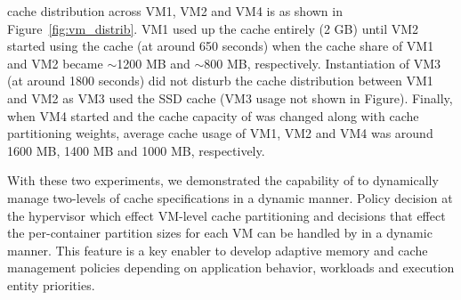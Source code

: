 \dd{} cache distribution across VM1, VM2 and VM4 is as shown in
Figure~\ref{fig:vm_distrib}.
%
VM1 used up the \dd{} cache entirely (2 GB) until VM2 started
using the cache (at around 650 seconds) when the cache share of
VM1 and VM2 became $\sim$1200 MB and $\sim$800 MB, respectively.
%
Instantiation of VM3 (at around 1800 seconds) did not disturb the cache
distribution between VM1 and VM2 as VM3 used the SSD cache (VM3 usage
not shown in Figure). 
%
Finally, when VM4 started and the cache capacity of \dd{} was changed 
along with cache partitioning weights, 
average cache usage of VM1, VM2 and VM4 was  
around 1600 MB, 1400 MB and 1000 MB, respectively.


With these two experiments, we demonstrated the capability of \dd{}
to dynamically manage two-levels of cache specifications in a
dynamic manner. Policy decision at the hypervisor which effect
VM-level cache partitioning and decisions that effect the
per-container partition sizes for each VM can be handled by \dd{}
in a dynamic manner. This feature is a key enabler to develop
adaptive memory and cache management policies depending
on application behavior, workloads and execution entity priorities.

